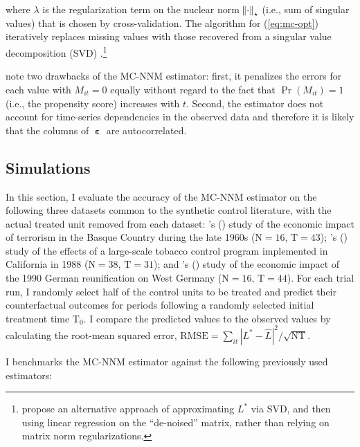 \documentclass[hidelinks,12pt]{article}
\newcommand{\possessivecite}[1]{\citeauthor{#1}'s (\citeyear{#1})}
\begin{document}
\noindent
where $\lambda$ is the regularization term on the nuclear norm $\norm{\cdot}_\star$ (i.e., sum of singular values) that is chosen by cross-validation. The algorithm for (\ref{eq:mc-opt}) iteratively replaces missing values with those recovered from a singular value decomposition (SVD) \citep{mazumder2010spectral}.\footnote{\citet{amjad2018robust} propose an alternative approach of approximating $L^{*}$ via SVD, and then using linear regression on the ``de-noised'' matrix, rather than relying on matrix norm regularizations.} 

\citet{athey2017matrix} note two drawbacks of the MC-NNM estimator: first, it penalizes the errors for each value with $M_{it} = 0$ equally without regard to the fact that $\Pr (M_{it}) = 1$ (i.e., the propensity score) increases with $t$. Second, the estimator does not account for time-series dependencies in the observed data and therefore it is likely that the columns of $\boldsymbol{\upepsilon}$ are autocorrelated.

\subsection{Simulations} \label{sims}

In this section, I evaluate the accuracy of the MC-NNM estimator on the following three datasets common to the synthetic control literature, with the actual treated unit removed from each dataset: \possessivecite{abadie2003economic} study of the economic impact of terrorism in the Basque Country during the late 1960s ($\text{N}=16$, $\text{T}=43$); \possessivecite{abadie2010synthetic} study of the effects of a large-scale tobacco control program implemented in California in 1988 ($\text{N}=38$, $\text{T}=31$); and \possessivecite{abadie2015comparative} study of the economic impact of the 1990 German reunification on West Germany ($\text{N}=16$, $\text{T}=44$). For each trial run, I randomly select half of the control units to be treated and predict their counterfactual outcomes for periods following a randomly selected initial treatment time $\text{T}_0$. I compare the predicted values to the observed values by calculating the root-mean squared error, $\text{RMSE} = \sum_{it}|L^{*} -\hat{L}|^2 / \sqrt{\text{NT}}$. 

I benchmarks the MC-NNM estimator against the following previously used estimators:
\end{document}
